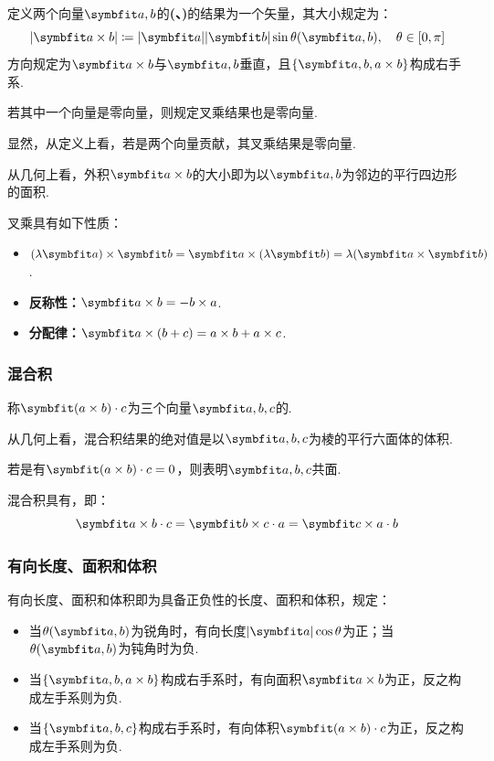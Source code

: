 \begin{definition}
    定义两个向量$\vb{a,b}$的\!\!\textbf{(\!\!\!\!、\!\!)}的结果为一个矢量，其大小规定为：
    \[|\vb{a \times b}| \coloneq |\vb{a}||\vb{b}|\sin\theta(\vb{a,b}),\quad \theta\in [0,\pi]\]
    方向规定为$\vb{a \times b}$与$\vb{a,b}$垂直，且$\{\vb{a,b,a \times b}\}$构成右手系.

    若其中一个向量是零向量，则规定叉乘结果也是零向量.
\end{definition}

显然，从定义上看，若是两个向量贡献，其叉乘结果是零向量.

从几何上看，外积$\vb{a \times b}$的大小即为以$\vb{a,b}$为邻边的平行四边形的面积.

叉乘具有如下性质：
\begin{itemize}
    \item $(\lambda\vb{a})\times\vb{b} = \vb{a}\times(\lambda\vb{b}) = \lambda(\vb{a}\times\vb{b})$.
    \item \textbf{反称性：}$\vb{a \times b = -b \times a}$.
    \item \textbf{分配律：}$\vb{a \times (b + c) = a \times b + a \times c}$.
\end{itemize}


\subsubsection{混合积}
\begin{definition}
    称$\vb{(a \times b)\cdot c}$为三个向量$\vb{a,b,c}$的.
\end{definition}

从几何上看，混合积结果的绝对值是以$\vb{a,b,c}$为棱的平行六面体的体积.

若是有$\vb{(a \times b)\cdot c} = 0$，则表明$\vb{a,b,c}$共面.

混合积具有，即：
\[\vb{a \times b\cdot c} = \vb{b \times c\cdot a} = \vb{c \times a\cdot b}\]


\subsubsection{有向长度、面积和体积}
\begin{definition}
    有向长度、面积和体积即为具备正负性的长度、面积和体积，规定：
    \begin{itemize}
        \item 当$\theta(\vb{a,b})$为锐角时，有向长度$|\vb{a}|\cos\theta$为正；当$\theta(\vb{a,b})$为钝角时为负.
        \item 当$\{\vb{a,b,a \times b}\}$构成右手系时，有向面积$\vb{a \times b}$为正，反之构成左手系则为负.
        \item 当$\{\vb{a,b,c}\}$构成右手系时，有向体积$\vb{(a \times b)\cdot c}$为正，反之构成左手系则为负.
    \end{itemize}
\end{definition}


